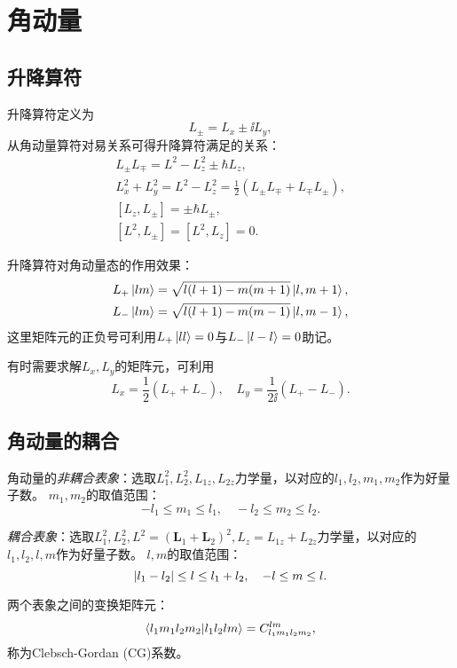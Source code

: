 \section{角动量}

\subsection{升降算符}

升降算符定义为
\begin{equation}
    L_\pm = L_x \pm \ii L_y,
\end{equation}
从角动量算符对易关系可得升降算符满足的关系：
\begin{equation}
\begin{aligned}
    L_\pm L_\mp = L^2 - L_z^2 \pm \hbar L_z, \\
    L_x^2 + L_y^2 = L^2 - L_z^2 = \frac12 \left(L_\pm L_\mp + L_\mp L_\pm \right), \\
    [L_z, L_\pm] = \pm \hbar L_\pm, \\
    [L^2, L_\pm] = [L^2, L_z] = 0.
\end{aligned}
\end{equation}

升降算符对角动量态的作用效果：
\begin{equation}
\begin{aligned}
    L_+ \ket{lm} &= \sqrt{l(l + 1) - m(m + 1)} \ket{l, m+1},\\
    L_- \ket{lm} &= \sqrt{l(l + 1) - m(m - 1)} \ket{l, m-1},
\end{aligned}
\end{equation}
这里矩阵元的正负号可利用$L_+\ket{ll}=0$与$L_-\ket{l-l}=0$助记。

有时需要求解$L_x, L_y$的矩阵元，可利用
\begin{equation}
    L_x = \frac12 (L_+ + L_-), \quad L_y = \frac{1}{2\ii} (L_+ - L_-).
\end{equation}

\subsection{角动量的耦合}

角动量的\emph{非耦合表象}：选取$L_1^2, L_2^2, L_{1z}, L_{2z}$力学量，以对应的$l_1,l_2,m_1,m_2$作为好量子数。
$m_1, m_2$的取值范围：
\begin{equation}
    -l_1 \le m_1 \le l_1,\quad -l_2 \le m_2 \le l_2.
\end{equation}

\emph{耦合表象}：选取$L_1^2, L_2^2, L^2=(\bm{L}_1 +\bm{L}_2)^2, L_z = L_{1z} + L_{2z}$力学量，以对应的$l_1,l_2,l,m$作为好量子数。
$l,m$的取值范围：
\begin{equation}
    \abs{l_1-l_2}\le l \le l_1+l_2,\quad -l \le m \le l.
\end{equation}

两个表象之间的变换矩阵元：
\begin{equation}
    \braket{l_1m_1l_2m_2}{l_1l_2lm} = C_{l_1m_1l_2m_2}^{lm},
\end{equation}
称为Clebsch-Gordan (CG)系数。
